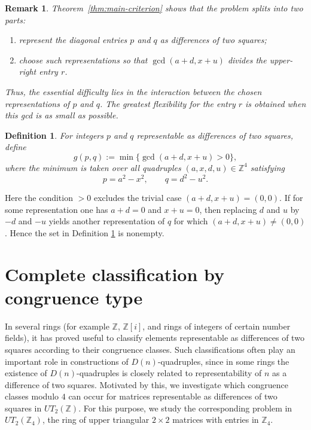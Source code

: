 \documentclass[11pt]{amsart}
\newtheorem{definition}{Definition}
\newtheorem{remark}{Remark}
\def\Z{\mathbb{Z}}
\begin{document}
\begin{remark}
Theorem~\ref{thm:main-criterion} shows that the problem splits into two parts:
\begin{enumerate}
\item represent the diagonal entries $p$ and $q$ as differences of two squares;
\item choose such representations so that $\gcd(a+d,x+u)$ divides the upper-right entry $r$.
\end{enumerate}
Thus, the essential difficulty lies in the interaction between the chosen representations of $p$ and $q$. The greatest flexibility for the entry $r$ is obtained when this gcd is as small as possible.
\end{remark}

\begin{definition}\label{def:g}
For integers $p$ and $q$ representable as differences of two squares, define
$$g(p,q):=\min \bigl\{\gcd(a+d,x+u)>0\bigr\},$$
where the minimum is taken over all quadruples $(a,x,d,u)\in\mathbb Z^4$ satisfying
$$p=a^2-x^2, \qquad q=d^2-u^2.$$
\end{definition}

Here the condition $>0$ excludes the trivial case $(a+d,x+u)=(0,0)$. If for some representation one has $a+d=0$ and $x+u=0$, then replacing
$d$ and $u$ by $-d$ and $-u$ yields another representation of $q$
for which $(a+d,x+u)\neq(0,0)$. Hence the set in Definition \ref{def:g}
is nonempty.





\section{Complete classification by congruence type}

In several rings (for example $\mathbb Z$, $\mathbb Z[i]$, and rings of integers of certain number fields), it has proved useful to classify elements representable as differences of two squares according to their congruence classes. Such classifications often play an important role in constructions of $D(n)$-quadruples, since in some rings the existence of $D(n)$-quadruples is closely related to representability of $n$ as a difference of two squares. Motivated by this, we investigate which congruence classes modulo $4$ can occur for matrices representable as differences of two squares in $UT_2(\mathbb Z)$. For this purpose, we study the corresponding problem in
$UT_2(\Z_4)$, the ring of upper triangular $2\times 2$ matrices with entries in $\mathbb Z_4$.
\end{document}
